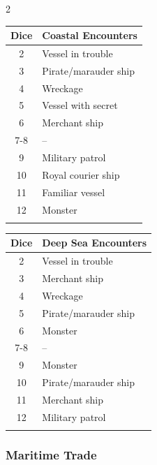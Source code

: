 \documentclass{book}
\begin{document}
\begin{multicols}{2}

\begin{table}[H]
	\centering
	\begin{tabular}[]{@{}cl@{}}
		\toprule\noalign{}
			Dice & Coastal Encounters \\
		\midrule\noalign{}
			2 & Vessel in trouble \\
			3 & Pirate/marauder ship \\
			4 & Wreckage \\
			5 & Vessel with secret \\
			6 & Merchant ship \\
			7-8 & -- \\
			9 & Military patrol \\
			10 & Royal courier ship \\
			11 & Familiar vessel \\
			12 & Monster \\
		\bottomrule\noalign{}
	\end{tabular}
\end{table}

\begin{table}[H]
	\centering
	\begin{tabular}[]{@{}cl@{}}
		\toprule\noalign{}
			Dice & Deep Sea Encounters \\
		\midrule\noalign{}
			2 & Vessel in trouble \\
			3 & Merchant ship \\
			4 & Wreckage \\
			5 & Pirate/marauder ship \\
			6 & Monster \\
			7-8 & -- \\
			9 & Monster \\
			10 & Pirate/marauder ship \\
			11 & Merchant ship \\
			12 & Military patrol \\
		\bottomrule\noalign{}
	\end{tabular}
\end{table}

\end{multicols}



\subsubsection*{Maritime Trade}\label{maritime-trade}
\end{document}
